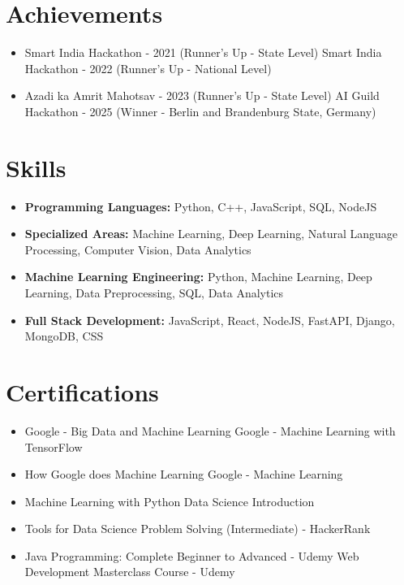 \documentclass[a4paper,10pt]{article}
\begin{document}
\section*{Achievements}
\begin{itemize}
\item Smart India Hackathon - 2021 (Runner's Up - State Level) \hfill Smart India Hackathon - 2022 (Runner's Up - National Level)
\item Azadi ka Amrit Mahotsav - 2023 (Runner's Up - State Level) \hfill AI Guild Hackathon - 2025 (Winner - Berlin and Brandenburg State, Germany)
\end{itemize}

\section*{Skills}
\begin{itemize}
  \item \textbf{Programming Languages:} Python, C++, JavaScript, SQL, NodeJS
  \item \textbf{Specialized Areas:} Machine Learning, Deep Learning, Natural Language Processing, Computer Vision, Data Analytics
  \item \textbf{Machine Learning Engineering:} Python, Machine Learning, Deep Learning, Data Preprocessing, SQL, Data Analytics
  \item \textbf{Full Stack Development:} JavaScript, React, NodeJS, FastAPI, Django, MongoDB, CSS
\end{itemize}

\section*{Certifications}
\begin{itemize}
\item Google - Big Data and Machine Learning \hfill Google - Machine Learning with TensorFlow
\item How Google does Machine Learning \hfill Google - Machine Learning
\item Machine Learning with Python \hfill Data Science Introduction
\item Tools for Data Science \hfill Problem Solving (Intermediate) - HackerRank
\item Java Programming: Complete Beginner to Advanced - Udemy \hfill Web Development Masterclass Course - Udemy
\end{itemize}
\end{document}
